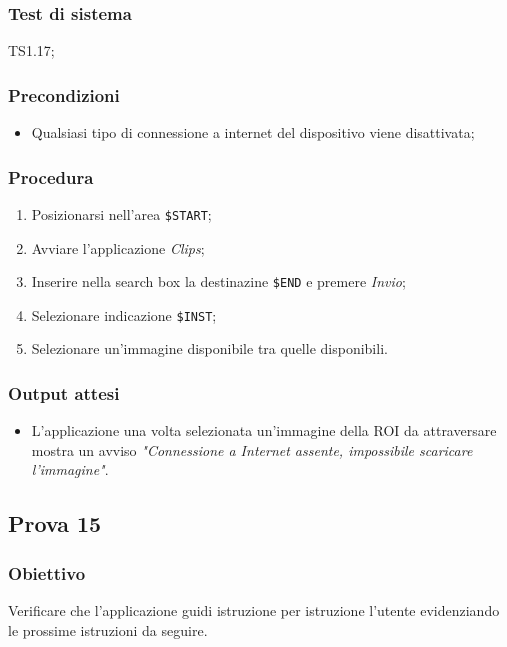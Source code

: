 \documentclass[../Sperimentazione.tex]{subfiles}
\begin{document}
	\subsubsection{Test di sistema}
		TS1.17;
		
	\subsubsection{Precondizioni}
		\begin{itemize}
			\item Qualsiasi tipo di connessione a internet del dispositivo viene disattivata;
		\end{itemize}				
		
	\subsubsection{Procedura}
		\begin{enumerate}
		\item Posizionarsi nell'area \verb|$START|;
		\item Avviare l'applicazione \textit{Clips};
		\item Inserire nella search box la destinazine  \verb|$END| e premere \textit{Invio};
		\item Selezionare indicazione  \verb|$INST|;
		\item Selezionare un'immagine disponibile tra quelle disponibili.
		\end{enumerate}

	\subsubsection{Output attesi}
		\begin{itemize}
		\item L'applicazione una volta selezionata un'immagine della ROI da attraversare mostra un avviso \textit{"Connessione a Internet assente, impossibile scaricare l'immagine"}.
		\end{itemize}

		
\newpage	
\subsection{Prova 15} %
\label{subsec:Prova15}	
	
	\subsubsection{Obiettivo}
		Verificare che l'applicazione guidi istruzione per istruzione l'utente evidenziando le prossime istruzioni da seguire.
		
\end{document}
